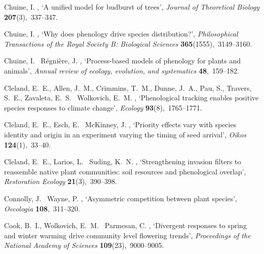 \documentclass[11pt]{article}
\begin{document}
\begin{thebibliography}{xx}
Chuine, I.  \harvardyearright , `A unified model for
  budburst of trees', {\em Journal of Theoretical Biology} {\bf
  207}(3),~337--347.

Chuine, I.  \harvardyearright , `Why does phenology drive
  species distribution?', {\em Philosophical Transactions of the Royal Society
  B: Biological Sciences} {\bf 365}(1555),~3149--3160.

Chuine, I. \harvardand\ R{\'e}gni{\`e}re, J.  \harvardyearright , `Process-based models of phenology for plants and
  animals', {\em Annual review of ecology, evolution, and systematics} {\bf
  48},~159--182.

Cleland, E.~E., Allen, J.~M., Crimmins, T.~M., Dunne, J.~A., Pau, S., Travers,
  S.~E., Zavaleta, E.~S. \harvardand\ Wolkovich, E.~M.  \harvardyearright , `Phenological tracking enables positive species
  responses to climate change', {\em Ecology} {\bf 93}(8),~1765--1771.

Cleland, E.~E., Esch, E. \harvardand\ McKinney, J.  \harvardyearleft
  2015\harvardyearright , `Priority effects vary with species identity and
  origin in an experiment varying the timing of seed arrival', {\em Oikos} {\bf
  124}(1),~33--40.

Cleland, E.~E., Larios, L. \harvardand\ Suding, K.~N.  \harvardyearleft
  2013\harvardyearright , `Strengthening invasion filters to reassemble native
  plant communities: soil resources and phenological overlap', {\em Restoration
  Ecology} {\bf 21}(3),~390--398.

Connolly, J. \harvardand\ Wayne, P.  \harvardyearright ,
  `Asymmetric competition between plant species', {\em Oecologia} {\bf
  108},~311--320.

Cook, B.~I., Wolkovich, E.~M. \harvardand\ Parmesan, C.  \harvardyearleft
  2012\harvardyearright , `Divergent responses to spring and winter warming
  drive community level flowering trends', {\em Proceedings of the National
  Academy of Sciences} {\bf 109}(23),~9000--9005.


\end{thebibliography}
\end{document}
